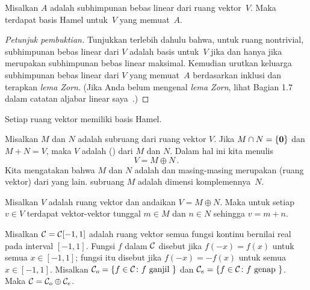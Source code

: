 \begin{prop}\label{bases025} Misalkan $A$ adalah subhimpunan bebas linear dari ruang
vektor~$V$. Maka terdapat basis Hamel untuk~$V$ yang memuat~$A$.
\end{prop}

\begin{proof}[\emph{Petunjuk pembuktian}] Tunjukkan terlebih dahulu bahwa, untuk ruang nontrivial, subhimpunan bebas linear dari $V$ adalah basis untuk~$V$
jika dan hanya jika merupakan subhimpunan bebas linear maksimal. Kemudian urutkan keluarga subhimpunan bebas linear dari
$V$ yang memuat~$A$ berdasarkan inklusi dan terapkan \emph{lema Zorn}. (Jika Anda belum mengenal \emph{lema Zorn},
lihat Bagian 1.7 dalam catatan aljabar linear saya~\cite{Erdman:2010}.)  \ns
\end{proof}

\begin{cor} Setiap ruang vektor memiliki basis Hamel.
\end{cor}

\begin{defn}\label{000082} Misalkan $M$ dan $N$ adalah subruang dari ruang vektor $V$. Jika
$M \cap N = \{\mathbf{0}\}$ dan $M + N = V$, maka $V$ adalah
 () dari $M$ dan $N$. Dalam hal ini kita menulis
   \[ V = M \oplus N\,. \]
Kita mengatakan bahwa $M$ dan $N$ adalah
 dan masing-masing merupakan  (ruang vektor) dari
yang lain. 
 subruang $M$ adalah dimensi komplemennya~$N$.
\end{defn}

\begin{prop}\label{0000823} Misalkan $V$ adalah ruang vektor dan andaikan $V = M \oplus N$. Maka untuk
setiap $v \in V$ terdapat vektor-vektor tunggal $m \in M$ dan $n \in N$ sehingga $v = m + n$.
\end{prop}

\begin{exam} Misalkan $\mathcal{C} = \mathcal{C}[-1,1]$ adalah ruang vektor semua fungsi kontinu bernilai real
pada interval $[-1,1]$. Fungsi $f$ dalam $\mathcal{C}$ disebut  jika $f(-x) =
f(x)$ untuk semua $x \in [-1,1]$; fungsi itu disebut  jika $f(-x) = -f(x)$ untuk semua $x \in [-1,1]$.
Misalkan $\mathcal{C}_o = \{f \in \mathcal{C}\colon  f \text{ ganjil }\}$ dan $\mathcal{C}_e = \{f \in \mathcal{C}\colon  f \text{ genap }\}$. Maka $\mathcal{C} = \mathcal{C}_o \oplus \mathcal{C}_e$.
\end{exam}

